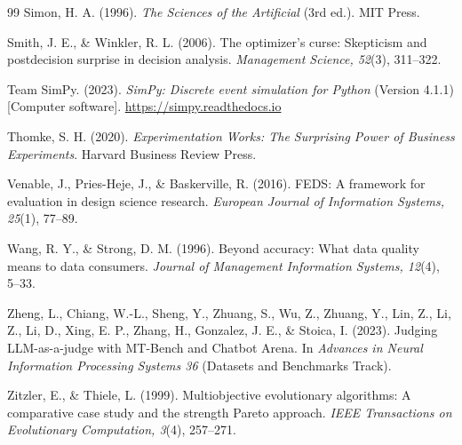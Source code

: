 \begin{thebibliography}{99}
 Simon, H. A. (1996). \textit{The Sciences of the Artificial} (3rd ed.). MIT Press.

 Smith, J. E., \& Winkler, R. L. (2006). The optimizer's curse: Skepticism and postdecision surprise in decision analysis. \textit{Management Science, 52}(3), 311--322. 

 Team SimPy. (2023). \textit{SimPy: Discrete event simulation for Python} (Version 4.1.1) [Computer software]. \url{https://simpy.readthedocs.io}

 Thomke, S. H. (2020). \textit{Experimentation Works: The Surprising Power of Business Experiments}. Harvard Business Review Press.

 Venable, J., Pries-Heje, J., \& Baskerville, R. (2016). FEDS: A framework for evaluation in design science research. \textit{European Journal of Information Systems, 25}(1), 77--89. 

 Wang, R. Y., \& Strong, D. M. (1996). Beyond accuracy: What data quality means to data consumers. \textit{Journal of Management Information Systems, 12}(4), 5--33. 

 Zheng, L., Chiang, W.-L., Sheng, Y., Zhuang, S., Wu, Z., Zhuang, Y., Lin, Z., Li, Z., Li, D., Xing, E. P., Zhang, H., Gonzalez, J. E., \& Stoica, I. (2023). Judging LLM-as-a-judge with MT-Bench and Chatbot Arena. In \textit{Advances in Neural Information Processing Systems 36} (Datasets and Benchmarks Track).

 Zitzler, E., \& Thiele, L. (1999). Multiobjective evolutionary algorithms: A comparative case study and the strength Pareto approach. \textit{IEEE Transactions on Evolutionary Computation, 3}(4), 257--271. 

\end{thebibliography}
